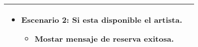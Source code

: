 \begin{table}[H]
{\begin{tabular}{|p{}|p{}|}
{\begin{itemize}[noitemsep]
\begin{itemize}[noitemsep]
        \item Mostrar mensaje de error, y solicitar que ingrese una nueva fecha
    \end{itemize}
    \item \textbf{Escenario 2:} Si esta disponible el artista.
    \vspace{-0.5\baselineskip}
    \begin{itemize}[noitemsep]
        \item Mostar mensaje de reserva exitosa.
    \end{itemize}
\end{itemize}
} \\ \hline
\end{tabular}%
}
\end{table}

